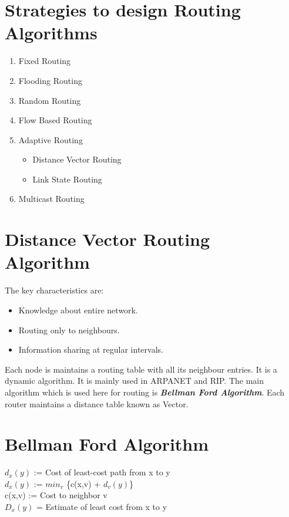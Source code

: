 \documentclass[12pt]{article}
\begin{document}
\section{Strategies to design Routing Algorithms}

\begin{enumerate}[label=(\alph*)]
    \item Fixed Routing
    \item Flooding Routing
    \item Random Routing
    \item Flow Based Routing
    \item Adaptive Routing
    \begin{itemize}
        \item Distance Vector Routing
        \item Link State Routing
    \end{itemize}
    \item Multicast Routing
\end{enumerate}

\section{Distance Vector Routing Algorithm}
The key characteristics are:
\begin{itemize}
    \item Knowledge about entire network.
    \item Routing only to neighbours.
    \item Information sharing at regular intervals.
\end{itemize}

Each node is maintains a routing table with all its neighbour entries. It is a dynamic algorithm. It is mainly used in ARPANET and
RIP. The main algorithm which is used here for routing is \textit{\textbf{Bellman Ford Algorithm}}. Each router maintains a distance table known as Vector.

\section{Bellman Ford Algorithm}
    $d_x(y)$ := Cost of least-cost path from x to y \\
    $d_x(y)$ := $min_v$ \{c(x,v) + $d_v(y)$\} \\
    c(x,v) := Cost to neighbor v \\
    $D_x(y)$ = Estimate of least cost from x to y \\
    
\end{document}
